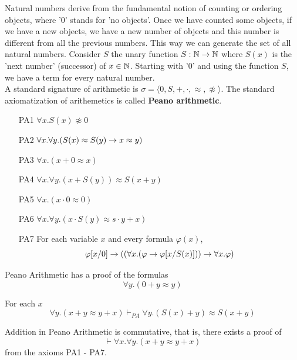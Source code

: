 \documentclass[english, 11pt]{article}
\begin{document}
    Natural numbers derive from the fundamental notion of counting or ordering objects, where '0' stands for 'no objects'. Once we have counted some objects, if we have a new objects, we have a new number of objects and this number is different from all the previous numbers. This way we can generate the set of all natural numbers. Consider $S$ the unary function $S: {\mathbb{N}} \rightarrow {\mathbb{N}}$ where $S(x)$ is the 'next number' (successor) of $x \in {\mathbb{N}}$. Starting with '0' and using the function $S$, we have a term for every natural number. \\

    A standard signature of arithmetic is $\sigma = \langle 0,S,+,\cdot,\approx,\not\approx\rangle$. The standard axiomatization of arithemetics is called \textbf{Peano arithmetic}.

    \begin{itemize}
      \item[PA1] $\forall x. S(x) \not \approx 0$
      \item[PA2] $\forall x. \forall y.(S(x) \approx S(y) \rightarrow x \approx y)$
      \item[PA3] $\forall x. (x + 0 \approx x)$
      \item[PA4] $\forall x. \forall y. (x + S(y)) \approx S(x+y)$
      \item[PA5] $\forall x. (x \cdot 0 \approx 0)$
      \item[PA6] $\forall x. \forall y. (x \cdot S(y) \approx s \cdot y + x)$
      \item[PA7] For each variable $x$ and every formula $\varphi(x)$,
      \[ \varphi[x/0] \rightarrow ((\forall x. (\varphi \rightarrow \varphi[x/S(x)])) \rightarrow \forall x. \varphi) \]
    \end{itemize}

    \begin{lem}
      Peano Arithmetic has a proof of the formulas
      \[ \forall y. (0+y \approx y) \]
    \end{lem}

    \begin{lem}
      For each  $x$
      \[ \forall y. (x+y \approx y + x) \vdash_{PA} \forall y. (S(x) + y) \approx S(x+y) \]
    \end{lem}

    \begin{thrm}
      Addition in Peano Arithmetic is commutative, that is, there exists a proof of
      \[ \vdash \forall x. \forall y. (x + y \approx y + x) \]
      from the axioms PA1 - PA7.
    \end{thrm}
\end{document}
